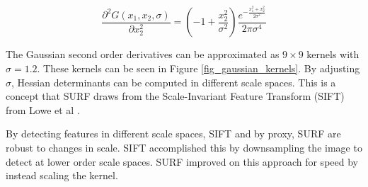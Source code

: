 \documentclass[sigconf]{acmart}
\begin{document}
\begin{equation}
\frac{\partial^2 G(x_1,x_2,\sigma)}{\partial x_2^2} = (-1 + \frac{x_2^2}{\sigma^2})\frac{e^{-\frac{x_1^2+x_2^2}{2\sigma^2}}}{2\pi \sigma^4}
\label{eq_partial_x2}
\end{equation}

The Gaussian second order derivatives can be approximated as $9 \times 9$ kernels with $\sigma=1.2$. These kernels can be seen in Figure \ref{fig_gaussian_kernels}. By adjusting $\sigma$, Hessian determinants can be computed in different scale spaces. This is a concept that SURF draws from the Scale-Invariant Feature Transform (SIFT) from Lowe et al \cite{lowe_distinctive_2004}.

By detecting features in different scale spaces, SIFT and by proxy, SURF are robust to changes in scale. SIFT accomplished this by downsampling the image to detect at lower order scale spaces. SURF improved on this approach for speed by instead scaling the kernel.
\end{document}
